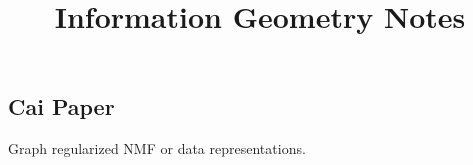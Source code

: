 \documentclass[12pt]{article}
\begin{document}
\title{Information Geometry Notes}
\maketitle

\subsection*{Cai Paper}
Graph regularized NMF or data representations.
\end{document}
